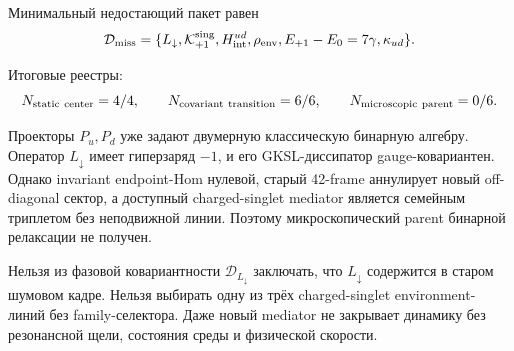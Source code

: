 Минимальный недостающий пакет равен
\begin{equation}
 \mathcal D_{\rm miss}=
 \{L_\downarrow,\mathcal K_{+1}^{\rm sing},
 H_{\rm int}^{ud},\rho_{\rm env},
 E_{+1}-E_0=7\gamma,\kappa_{ud}\}.
 \label{eq:v8-binary-carrier-missing-data}
\end{equation}

Итоговые реестры:
\begin{equation}
 N_{\rm static\ center}=4/4,\qquad
 N_{\rm covariant\ transition}=6/6,\qquad
 N_{\rm microscopic\ parent}=0/6.
 \label{eq:v8-binary-carrier-ledgers}
\end{equation}

\begin{theorem}
Проекторы $P_u,P_d$ уже задают двумерную классическую бинарную алгебру.
Оператор $L_\downarrow$ имеет гиперзаряд $-1$, и его GKSL-диссипатор
gauge-ковариантен. Однако invariant endpoint-Hom нулевой, старый 42-frame
аннулирует новый off-diagonal сектор, а доступный charged-singlet mediator
является семейным триплетом без неподвижной линии. Поэтому микроскопический
parent бинарной релаксации не получен.
\end{theorem}

\begin{nogocriterion}
Нельзя из фазовой ковариантности $\mathcal D_{L_\downarrow}$ заключать, что
$L_\downarrow$ содержится в старом шумовом кадре. Нельзя выбирать одну из
трёх charged-singlet environment-линий без family-селектора. Даже новый
mediator не закрывает динамику без резонансной щели, состояния среды и
физической скорости.
\end{nogocriterion}

